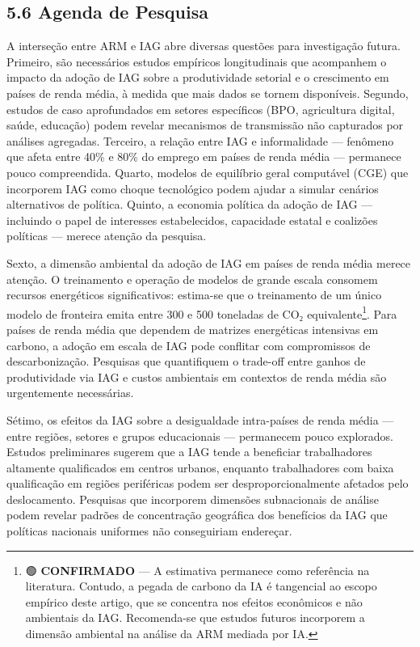 \documentclass[
  brazilian,
  12pt,
]{article}
\begin{document}
\subsection{5.6 Agenda de Pesquisa}\label{agenda-de-pesquisa}

A interseção entre ARM e IAG abre diversas questões para investigação futura. Primeiro, são necessários estudos empíricos longitudinais que acompanhem o impacto da adoção de IAG sobre a produtividade setorial e o crescimento em países de renda média, à medida que mais dados se tornem disponíveis. Segundo, estudos de caso aprofundados em setores específicos (BPO, agricultura digital, saúde, educação) podem revelar mecanismos de transmissão não capturados por análises agregadas. Terceiro, a relação entre IAG e informalidade --- fenômeno que afeta entre 40\% e 80\% do emprego em países de renda média --- permanece pouco compreendida. Quarto, modelos de equilíbrio geral computável (CGE) que incorporem IAG como choque tecnológico podem ajudar a simular cenários alternativos de política. Quinto, a economia política da adoção de IAG --- incluindo o papel de interesses estabelecidos, capacidade estatal e coalizões políticas --- merece atenção da pesquisa.

Sexto, a dimensão ambiental da adoção de IAG em países de renda média merece atenção. O treinamento e operação de modelos de grande escala consomem recursos energéticos significativos: estima-se que o treinamento de um único modelo de fronteira emita entre 300 e 500 toneladas de CO₂ equivalente\footnote{🟢 \textbf{CONFIRMADO} --- A estimativa permanece como referência na literatura. Contudo, a pegada de carbono da IA é tangencial ao escopo empírico deste artigo, que se concentra nos efeitos econômicos e não ambientais da IAG. Recomenda-se que estudos futuros incorporem a dimensão ambiental na análise da ARM mediada por IA.}. Para países de renda média que dependem de matrizes energéticas intensivas em carbono, a adoção em escala de IAG pode conflitar com compromissos de descarbonização. Pesquisas que quantifiquem o trade-off entre ganhos de produtividade via IAG e custos ambientais em contextos de renda média são urgentemente necessárias.

Sétimo, os efeitos da IAG sobre a desigualdade intra-países de renda média --- entre regiões, setores e grupos educacionais --- permanecem pouco explorados. Estudos preliminares sugerem que a IAG tende a beneficiar trabalhadores altamente qualificados em centros urbanos, enquanto trabalhadores com baixa qualificação em regiões periféricas podem ser desproporcionalmente afetados pelo deslocamento. Pesquisas que incorporem dimensões subnacionais de análise podem revelar padrões de concentração geográfica dos benefícios da IAG que políticas nacionais uniformes não conseguiriam endereçar.
\end{document}

